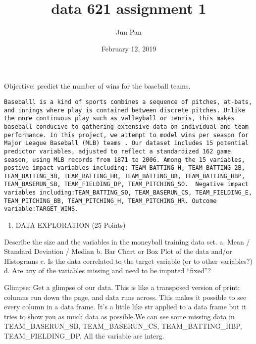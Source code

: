 \documentclass[]{article}
\title{data 621 assignment 1}
\author{Jun Pan}
\date{February 12, 2019}
\providecommand{\tightlist}{%
  \setlength{\itemsep}{0pt}\setlength{\parskip}{0pt}}
\begin{document}
\maketitle

Objective: predict the number of wins for the baseball teams.

\begin{verbatim}
Baseballl is a kind of sports combines a sequence of pitches, at-bats, and innings where play is contained between discrete pitches. Unlike the more continuous play such as valleyball or tennis, this makes baseball conducive to gathering extensive data on individual and team performance. In this project, we attempt to model wins per season for Major League Baseball (MLB) teams . Our dataset includes 15 potential predictor variables, adjusted to reflect a standardized 162 game season, using MLB records from 1871 to 2006. Among the 15 variables, postive impact variables including: TEAM_BATTING_H, TEAM_BATTING_2B, TEAM_BATTING_3B, TEAM_BATTING_HR, TEAM_BATTING_BB, TEAM_BATTING_HBP, TEAM_BASERUN_SB, TEAM_FIELDING_DP, TEAM_PITCHING_SO.  Negative impact variables including:TEAM_BATTING_SO, TEAM_BASERUN_CS, TEAM_FIELDING_E,  TEAM_PITCHING_BB, TEAM_PITCHING_H, TEAM_PITCHING_HR. Outcome variable:TARGET_WINS.
\end{verbatim}

\begin{enumerate}
\def\labelenumi{\arabic{enumi}.}
\tightlist
\item
  DATA EXPLORATION (25 Points)
\end{enumerate}

Describe the size and the variables in the moneyball training data set.
a. Mean / Standard Deviation / Median b. Bar Chart or Box Plot of the
data and/or Histograms c. Is the data correlated to the target variable
(or to other variables?)\\
d. Are any of the variables missing and need to be imputed ``fixed''?

Glimpse: Get a glimpse of our data. This is like a transposed version of
print: columns run down the page, and data runs across. This makes it
possible to see every column in a data frame. It's a little like str
applied to a data frame but it tries to show you as much data as
possible.We can see some missing data in TEAM\_BASERUN\_SB,
TEAM\_BASERUN\_CS, TEAM\_BATTING\_HBP, TEAM\_FIELDING\_DP. All the
variable are interg.
\end{document}
